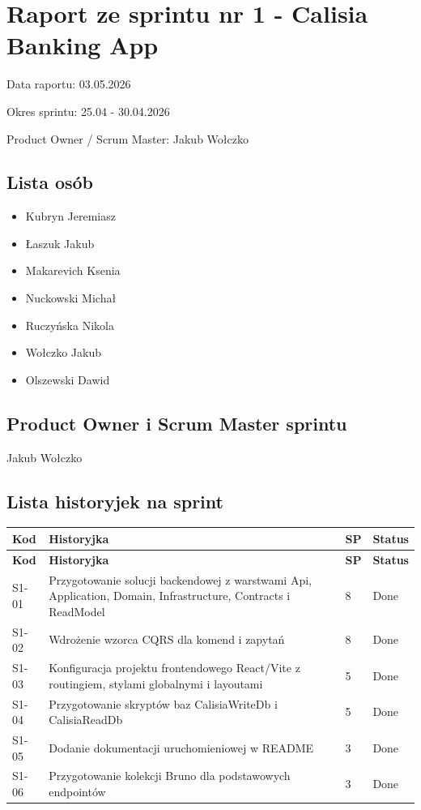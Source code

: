 \documentclass[12pt,a4paper]{article}
\begin{document}
\section*{Raport ze sprintu nr 1 - Calisia Banking App}
Data raportu: 03.05.2026

Okres sprintu: 25.04 - 30.04.2026

Product Owner / Scrum Master: Jakub Wołczko

\subsection*{Lista osób}
\begin{itemize}
\item Kubryn Jeremiasz
\item Łaszuk Jakub
\item Makarevich Ksenia
\item Nuckowski Michał
\item Ruczyńska Nikola
\item Wołczko Jakub
\item Olszewski Dawid
\end{itemize}

\subsection*{Product Owner i Scrum Master sprintu}
Jakub Wołczko

\subsection*{Lista historyjek na sprint}
\begingroup
\footnotesize
{}
\begin{longtable}{@{}C{0.08\textwidth}L{0.62\textwidth}C{0.10\textwidth}L{0.12\textwidth}@{}}
\toprule
{}
\textbf{Kod} & \textbf{Historyjka} & \textbf{SP} & \textbf{Status} \\
\midrule
\endfirsthead
\toprule
{}
\textbf{Kod} & \textbf{Historyjka} & \textbf{SP} & \textbf{Status} \\
\midrule
\endhead
S1-01 & Przygotowanie solucji backendowej z warstwami Api, Application, Domain, Infrastructure, Contracts i ReadModel & 8 & Done \\
S1-02 & Wdrożenie wzorca CQRS dla komend i zapytań & 8 & Done \\
S1-03 & Konfiguracja projektu frontendowego React/Vite z routingiem, stylami globalnymi i layoutami & 5 & Done \\
S1-04 & Przygotowanie skryptów baz CalisiaWriteDb i CalisiaReadDb & 5 & Done \\
S1-05 & Dodanie dokumentacji uruchomieniowej w README & 3 & Done \\
S1-06 & Przygotowanie kolekcji Bruno dla podstawowych endpointów & 3 & Done \\
\bottomrule
\end{longtable}
\endgroup
\end{document}
